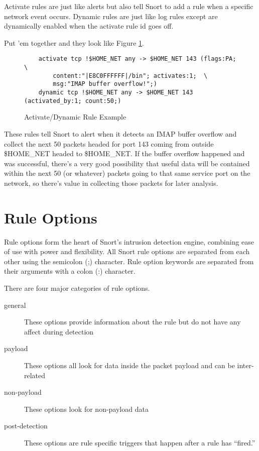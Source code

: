 \documentclass[english]{report}
\begin{document}
Activate rules are just like alerts but also tell Snort to add a rule when a
specific network event occurs. Dynamic rules are just like log rules except are
dynamically enabled when the activate rule id goes off. 

Put 'em together and they look like Figure \ref{activate/dynamic rule example}.

\begin{figure}
\begin{verbatim}
    activate tcp !$HOME_NET any -> $HOME_NET 143 (flags:PA; \
        content:"|E8C0FFFFFF|/bin"; activates:1;  \
        msg:"IMAP buffer overflow!";)
    dynamic tcp !$HOME_NET any -> $HOME_NET 143 (activated_by:1; count:50;)
\end{verbatim}

\caption{Activate/Dynamic Rule Example}
\label{activate/dynamic rule example}
\end{figure}

These rules tell Snort to alert when it detects an IMAP buffer overflow and
collect the next 50 packets headed for port 143 coming from outside \$HOME\_NET
headed to \$HOME\_NET. If the buffer overflow happened and was successful,
there's a very good possibility that useful data will be contained within the
next 50 (or whatever) packets going to that same service port on the network,
so there's value in collecting those packets for later analysis.

\section{Rule Options}

Rule options form the heart of Snort's intrusion detection engine, combining
ease of use with power and flexibility. All Snort rule options are separated
from each other using the semicolon (;) character. Rule option keywords are
separated from their arguments with a colon (:) character. 

There are four major categories of rule options.  

\begin{description}

\item [general] These options provide information about the rule but do not
have any affect during detection 

\item [payload] These options all look for data inside the packet payload and
can be inter-related

\item [non-payload] These options look for non-payload data

\item [post-detection] These options are rule specific triggers that happen
after a rule has ``fired.''

\end{description}
\end{document}
